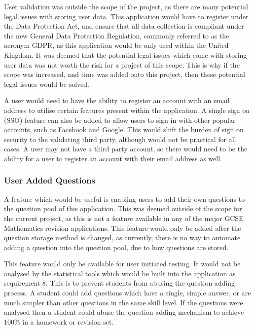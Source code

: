 \documentclass{article}
\begin{document}
User validation was outside the scope of the project, as there are many potential legal issues with storing user data. This application would have to register under the Data Protection Act, and ensure that all data collection is compliant under the new General Data Protection Regulation, commonly referred to as the acronym GDPR, as this application would be only used within the United Kingdom. It was deemed that the potential legal issues which come with storing user data was not worth the risk for a project of this scope. This is why if the scope was increased, and time was added onto this project, then these potential legal issues would be solved. \par

A user would need to have the ability to register an account with an email address to utilise certain features present within the application. A single sign on (SSO) feature can also be added to allow users to sign in with other popular accounts, such as Facebook and Google. This would shift the burden of sign on security to the validating third party, although would not be practical for all cases. A user may not have a third party account, so there would need to be the ability for a user to register an account with their email address as well. \par

\subsubsection{User Added Questions}

A feature which would be useful is enabling users to add their own questions to the question pool of this application. This was deemed outside of the scope for the current project, as this is not a feature available in any of the major GCSE Mathematics revision applications. This feature would only be added after the question storage method is changed, as currently, there is no way to automate adding a question into the question pool, due to how questions are stored. \par

This feature would only be available for user initiated testing. It would not be analysed by the statistical tools which would be built into the application as requirement 8. This is to prevent students from abusing the question adding process. A student could add questions which have a single, simple answer, or are much simpler than other questions in the same skill level. If the questions were analysed then a student could abuse the question adding mechanism to achieve 100\% in a homework or revision set. \par
\end{document}
